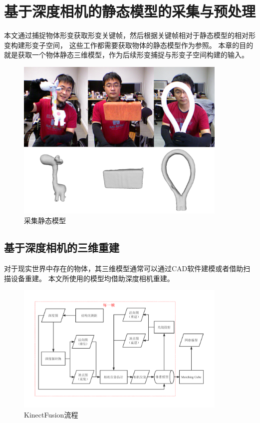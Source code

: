 \chapter{基于深度相机的静态模型的采集与预处理}

 本文通过捕捉物体形变获取形变关键帧，然后根据关键帧相对于静态模型的相对形变构建形变子空间，
 这些工作都需要获取物体的静态模型作为参照。
 本章的目的就是获取一个物体静态三维模型，作为后续形变捕捉与形变子空间构建的输入。
\begin{figure}[h]
    \centering
    \includegraphics[width=0.9\textwidth]{./Pictures/static_mesh.eps}
    \caption{采集静态模型}
    \label{static_model}
\end{figure}

\section{基于深度相机的三维重建}
对于现实世界中存在的物体，其三维模型通常可以通过CAD软件建模或者借助扫描设备重建。
本文所使用的模型均借助深度相机重建。
\begin{figure}[h]
    \centering
    \includegraphics[width = 0.9\textwidth]{./Pictures/kf_pipeline_cropped.pdf}
    \caption{KinectFusion流程}
    \label{kfpipeline}
\end{figure}


